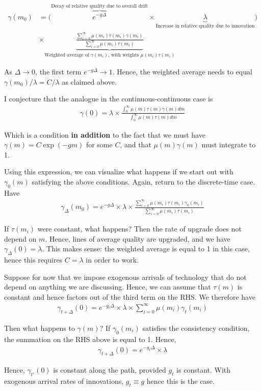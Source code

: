 \documentclass[12pt,english]{article}
\theoremstyle{remark}
\begin{document}
\begin{itemize}
	\begin{align*}
		\gamma (m_0) &= \Bigg(\overbrace{e^{-g\Delta}}^{\text{Decay of relative quality due to overall drift}} \times \underbrace{\lambda }_{\text{Increase in relative quality due to innovation}} \Bigg) \\
		&\times
		\underbrace{\frac{\sum_{i=0}^{\infty} \mu(m_i) \tau(m_i) \gamma(m_i)}{\sum_{i=0}^{\infty}\mu(m_i)\tau(m_i)}}_{\text{Weighted average of $\gamma(m_i)$, with weights $\mu(m_i)\tau(m_i)$}}
	\end{align*}
	
	As $\Delta \to 0$, the first term $e^{-g\Delta} \to 1$. Hence, the weighted average needs to equal $\gamma(m_0) / \lambda = C / \lambda$ as claimed above. 
	
	I conjecture that the analogue in the continuous-continuous case is 
	\begin{align*}
		\gamma(0) = \lambda \times \frac{\int_0^{\infty} \mu(m)\tau(m)\gamma(m)dm}{\int_0^{\infty}\mu(m) \tau(m) dm}
	\end{align*}
	
	Which is a condition \textbf{in addition }to the fact that we must have $\gamma(m) = C\exp(-gm)$ for some $C$, and that $\mu(m)\gamma(m)$ must integrate to 1. 
	
	Using this expression, we can visualize what happens if we start out with $\gamma_0(m)$ satisfying the above conditions. Again, return to the discrete-time case. Have 
	\begin{align*}
		\gamma_{\Delta}(m_0) = e^{-g\Delta} \times \lambda \times \frac{\sum_{i=0}^{\infty} \mu(m_i) \tau(m_i) \gamma_0(m_i)}{\sum_{i=0}^{\infty}\mu(m_i)\tau(m_i)}
	\end{align*}
	
	If $\tau(m_i)$ were constant, what happens? Then the rate of upgrade does not depend on $m$. Hence, lines of average quality are upgraded, and we have $\gamma_{\Delta}(0) = \lambda$. This makes sense: the weighted average is equal to 1 in this case, hence this requires $C = \lambda$ in order to work.
	
	Suppose for now that we impose exogenous arrivals of technology that do not depend on anything we are discussing. Hence, we can assume that $\tau(m)$ is constant and hence factors out of the third term on the RHS. We therefore have 
	\begin{align*}
		\gamma_{t+\Delta} (0) = e^{-g_t\Delta} \times \lambda \times \sum_{i=0}^{\infty} \mu(m_i) \gamma_t(m_i) 
	\end{align*}
	
	Then what happens to $\gamma(m)$? If $\gamma_0(m_i)$ satisfies the consistency condition, the summation on the RHS above is equal to 1. Hence, 
	\begin{align*}
		\gamma_{t+\Delta}(0) = e^{-g_t \Delta} \times \lambda
	\end{align*}

	Hence, $\gamma_{t'} (0)$ is constant along the path, provided $g_t$ is constant. With exogenous arrival rates of innovations, $g_t \equiv g$ hence this is the case.
	
\end{itemize}
\end{document}
